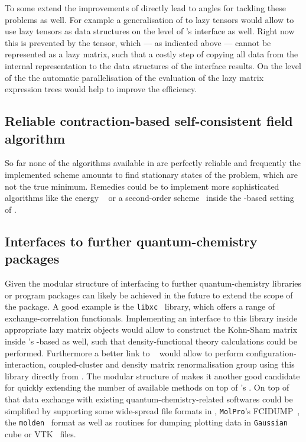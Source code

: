 To some extend the improvements
of \lazyten directly lead to angles for tackling these problems as well.
For example a generalisation of \lazyten to lazy tensors
would allow to use lazy tensors as data structures on the level of \molsturm's
interface as well.
Right now this is prevented by the \ERI tensor,
which --- as indicated above --- cannot be represented as a lazy matrix,
such that a costly step of copying all data from the internal
representation to the data structures of the interface results.
On the level of the \SCF the automatic parallelisation
of the evaluation of the lazy matrix expression trees
would help to improve the efficiency.

\subsection{Reliable contraction-based self-consistent field algorithm}
So far none of the \SCF algorithms available in \molsturm
are perfectly reliable and frequently the implemented \SCF scheme
amounts to find stationary states of the \HF problem,
which are not the true \SCF minimum.
Remedies could be to implement more sophisticated algorithms like
the energy \DIIS~\cite{Kudin2002}
or a second-order \SCF scheme~\cite{Salek2007,Hoest2008}
inside the \contraction-based setting of \molsturm.

\subsection{Interfaces to further quantum-chemistry packages}
\label{sec:ExtensionInterfaces}
Given the modular structure of \molsturm
interfacing to further quantum-chemistry libraries or program packages
can likely be achieved in the future to extend the scope of the package.
A good example is the \texttt{libxc}~\cite{Lehtola2018} library,
which offers a range of exchange-correlation functionals.
Implementing an interface to this library inside appropriate
lazy matrix objects would allow to construct the Kohn-Sham matrix
inside \molsturm's \contraction-based \SCF as well,
such that density-functional theory calculations
could be performed.
Furthermore a better link to \pyscf~\cite{Sun2017}
would allow to perform configuration-interaction,
coupled-cluster and density matrix renormalisation group
using this library directly from \molsturm.
The modular structure of \psifour makes it another good candidate
for quickly extending the number of available methods
on top of \molsturm's \SCF.
On top of that data exchange with existing quantum-chemistry-related softwares
could be simplified by supporting some wide-spread file formats in \molsturm,
\eg \texttt{MolPro}'s FCIDUMP~\cite{Knowles1989},
the \texttt{molden}~\cite{Schaftenaar2000} format
as well as routines for dumping plotting data
in \texttt{Gaussian}~\cite{Frisch2016} cube or VTK~\cite{Avila2010} files.

